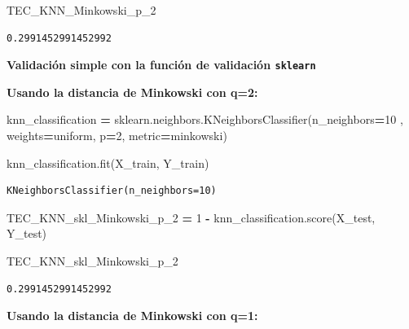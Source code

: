 \documentclass[
  11pt,
  a4paper,
]{article}
\newenvironment{Shaded}{\begin{snugshade}}{\end{snugshade}}
\newcommand{\DecValTok}[1]{\textcolor[rgb]{0.00,0.00,0.81}{#1}}
\newcommand{\NormalTok}[1]{#1}
\newcommand{\OperatorTok}[1]{\textcolor[rgb]{0.81,0.36,0.00}{\textbf{#1}}}
\newcommand{\StringTok}[1]{\textcolor[rgb]{0.31,0.60,0.02}{#1}}
\begin{document}
\begin{Shaded}
\begin{Highlighting}[]
\NormalTok{TEC\_KNN\_Minkowski\_p\_2}
\end{Highlighting}
\end{Shaded}

\begin{verbatim}
0.2991452991452992
\end{verbatim}

\vspace{0.6cm}

\textbf{Validación simple con la función de validación \texttt{sklearn}}

\vspace{0.2cm}

\textbf{Usando la distancia de Minkowski con q=2:}

\begin{Shaded}
\begin{Highlighting}[]
\NormalTok{knn\_classification }\OperatorTok{=}\NormalTok{ sklearn.neighbors.KNeighborsClassifier(n\_neighbors}\OperatorTok{=}\DecValTok{10}\NormalTok{ ,  weights}\OperatorTok{=}\StringTok{\textquotesingle{}uniform\textquotesingle{}}\NormalTok{, p}\OperatorTok{=}\DecValTok{2}\NormalTok{, metric}\OperatorTok{=}\StringTok{\textquotesingle{}minkowski\textquotesingle{}}\NormalTok{)}

\NormalTok{knn\_classification.fit(X\_train, Y\_train)}
\end{Highlighting}
\end{Shaded}

\begin{verbatim}
KNeighborsClassifier(n_neighbors=10)
\end{verbatim}

\begin{Shaded}
\begin{Highlighting}[]
\NormalTok{TEC\_KNN\_skl\_Minkowski\_p\_2 }\OperatorTok{=} \DecValTok{1} \OperatorTok{{-}}\NormalTok{ knn\_classification.score(X\_test, Y\_test)}

\NormalTok{TEC\_KNN\_skl\_Minkowski\_p\_2}
\end{Highlighting}
\end{Shaded}

\begin{verbatim}
0.2991452991452992
\end{verbatim}

\vspace{0.2cm}

\textbf{Usando la distancia de Minkowski con q=1:}
\end{document}
